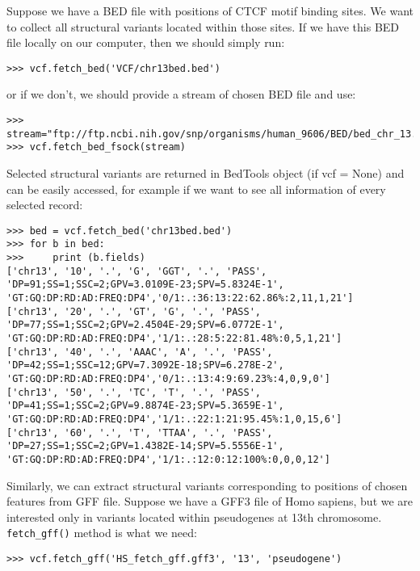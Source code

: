 \noindent Suppose we have a BED file with positions of CTCF motif binding sites. We want to collect all structural variants
located within those sites. If we have this BED file locally on our computer, then we should simply run:


\begin{verbatim}
>>> vcf.fetch_bed('VCF/chr13bed.bed')

\end{verbatim}


\noindent or if we don't, we should provide a stream of chosen BED file and use:


\begin{verbatim}
>>> stream="ftp://ftp.ncbi.nih.gov/snp/organisms/human_9606/BED/bed_chr_13.bed.gz"
>>> vcf.fetch_bed_fsock(stream)

\end{verbatim}


\noindent Selected structural variants are returned in BedTools object (if vcf = None) and can be easily accessed, for example
if we want to see all information of every selected record:


\begin{verbatim}
>>> bed = vcf.fetch_bed('chr13bed.bed')
>>> for b in bed:
>>>     print (b.fields)
['chr13', '10', '.', 'G', 'GGT', '.', 'PASS', 'DP=91;SS=1;SSC=2;GPV=3.0109E-23;SPV=5.8324E-1',
'GT:GQ:DP:RD:AD:FREQ:DP4','0/1:.:36:13:22:62.86%:2,11,1,21']
['chr13', '20', '.', 'GT', 'G', '.', 'PASS', 'DP=77;SS=1;SSC=2;GPV=2.4504E-29;SPV=6.0772E-1',
'GT:GQ:DP:RD:AD:FREQ:DP4','1/1:.:28:5:22:81.48%:0,5,1,21']
['chr13', '40', '.', 'AAAC', 'A', '.', 'PASS', 'DP=42;SS=1;SSC=12;GPV=7.3092E-18;SPV=6.278E-2',
'GT:GQ:DP:RD:AD:FREQ:DP4','0/1:.:13:4:9:69.23%:4,0,9,0']
['chr13', '50', '.', 'TC', 'T', '.', 'PASS', 'DP=41;SS=1;SSC=2;GPV=9.8874E-23;SPV=5.3659E-1',
'GT:GQ:DP:RD:AD:FREQ:DP4','1/1:.:22:1:21:95.45%:1,0,15,6']
['chr13', '60', '.', 'T', 'TTAA', '.', 'PASS', 'DP=27;SS=1;SSC=2;GPV=1.4382E-14;SPV=5.5556E-1',
'GT:GQ:DP:RD:AD:FREQ:DP4','1/1:.:12:0:12:100%:0,0,0,12']
\end{verbatim}


\noindent Similarly, we can extract structural variants corresponding to positions of chosen features from GFF file. Suppose
we have a GFF3 file of Homo sapiens, but we are interested only in variants located within pseudogenes
at 13th chromosome. \verb|fetch_gff()| method is what we need:


\begin{verbatim}
>>> vcf.fetch_gff('HS_fetch_gff.gff3', '13', 'pseudogene')
\end{verbatim}


